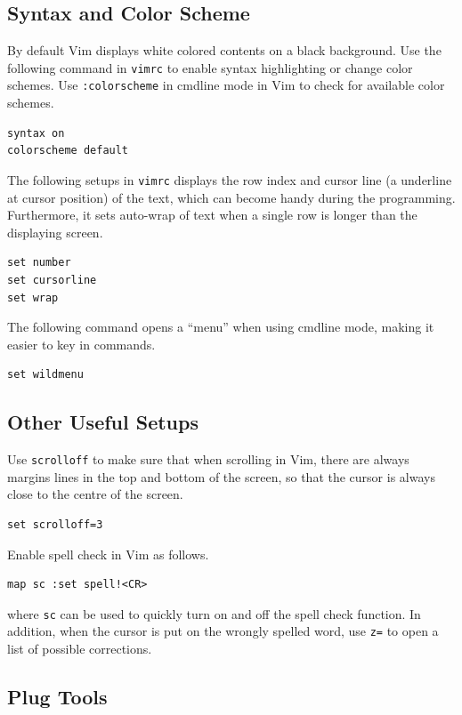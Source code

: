 \subsection{Syntax and Color Scheme}

By default Vim displays white colored contents on a black background. Use the following command in \verb|vimrc| to enable syntax highlighting or change color schemes. Use \verb|:colorscheme| in cmdline mode in Vim to check for available color schemes.
\begin{lstlisting}
syntax on
colorscheme default
\end{lstlisting}

The following setups in \verb|vimrc| displays the row index and cursor line (a underline at cursor position) of the text, which can become handy during the programming. Furthermore, it sets auto-wrap of text when a single row is longer than the displaying screen.
\begin{lstlisting}
set number
set cursorline
set wrap
\end{lstlisting}

The following command opens a ``menu'' when using cmdline mode, making it easier to key in commands.
\begin{lstlisting}
set wildmenu
\end{lstlisting}

\subsection{Other Useful Setups}

Use \verb|scrolloff| to make sure that when scrolling in Vim, there are always margins lines in the top and bottom of the screen, so that the cursor is always close to the centre of the screen.
\begin{lstlisting}
set scrolloff=3
\end{lstlisting}

Enable spell check in Vim as follows.
\begin{lstlisting}
map sc :set spell!<CR>
\end{lstlisting}
where \verb|sc| can be used to quickly turn on and off the spell check function. In addition, when the cursor is put on the wrongly spelled word, use \verb|z=| to open a list of possible corrections.

\subsection{Plug Tools}

